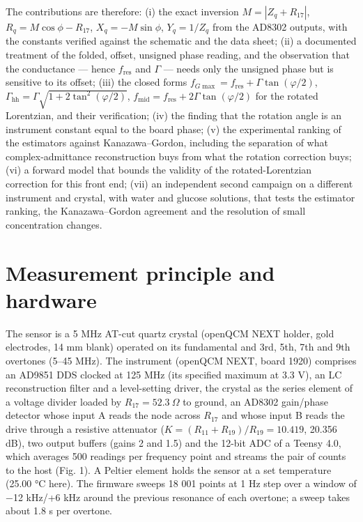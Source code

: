 \documentclass[11pt,a4paper]{article}
\begin{document}
The contributions are therefore: (i) the exact inversion
\(M = |Z_q + R_{17}|\), \(R_q = M\cos\phi - R_{17}\),
\(X_q = -M\sin\phi\), \(Y_q = 1/Z_q\) from the AD8302 outputs, with the
constants verified against the schematic and the data sheet; (ii) a
documented treatment of the folded, offset, unsigned phase reading, and
the observation that the conductance --- hence \(f_\mathrm{res}\) and
\(\Gamma\) --- needs only the unsigned phase but is sensitive to its
offset; (iii) the closed forms
\(f_{G\max} = f_\mathrm{res} + \Gamma\tan(\varphi/2)\),
\(\Gamma_\mathrm{hh} = \Gamma\sqrt{1 + 2\tan^2(\varphi/2)}\),
\(f_\mathrm{mid} = f_\mathrm{res} + 2\Gamma\tan(\varphi/2)\) for the
rotated Lorentzian, and their verification; (iv) the finding that the
rotation angle is an instrument constant equal to the board phase; (v)
the experimental ranking of the estimators against Kanazawa--Gordon,
including the separation of what complex-admittance reconstruction buys
from what the rotation correction buys; (vi) a forward model that bounds
the validity of the rotated-Lorentzian correction for this front end;
(vii) an independent second campaign on a different instrument and
crystal, with water and glucose solutions, that tests the estimator
ranking, the Kanazawa--Gordon agreement and the resolution of small
concentration changes.

\hypertarget{measurement-principle-and-hardware}{%
\section{Measurement principle and
hardware}\label{measurement-principle-and-hardware}}

The sensor is a 5 MHz AT-cut quartz crystal (openQCM NEXT holder, gold
electrodes, 14 mm blank) operated on its fundamental and 3rd, 5th, 7th
and 9th overtones (5--45 MHz). The instrument (openQCM NEXT, board 1920)
comprises an AD9851 DDS clocked at 125 MHz (its specified maximum at 3.3
V), an LC reconstruction filter and a level-setting driver, the crystal
as the series element of a voltage divider loaded by
\(R_{17} = 52.3\ \Omega\) to ground, an AD8302 gain/phase detector whose
input A reads the node across \(R_{17}\) and whose input B reads the
drive through a resistive attenuator
(\(K = (R_{11}+R_{19})/R_{19} = 10.419\), 20.356 dB), two output buffers
(gains 2 and 1.5) and the 12-bit ADC of a Teensy 4.0, which averages 500
readings per frequency point and streams the pair of counts to the host
(Fig. 1). A Peltier element holds the sensor at a set temperature (25.00
°C here). The firmware sweeps 18 001 points at 1 Hz step over a window
of −12 kHz/+6 kHz around the previous resonance of each overtone; a
sweep takes about 1.8 s per overtone.
\end{document}
